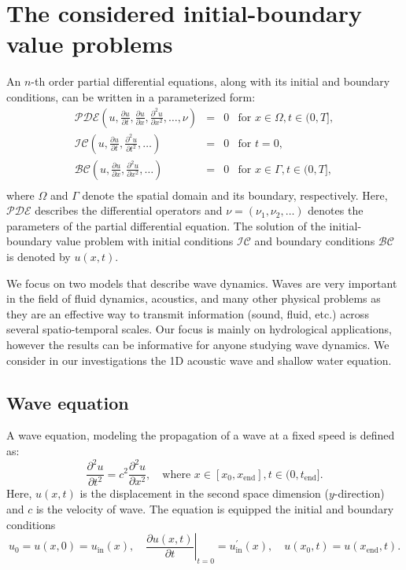 \section{The considered initial-boundary value problems}

An $n$-th order partial differential equations, along with its initial and boundary conditions, can be written in a parameterized form: 
\[
\begin{array}{rcll}
\displaystyle \mathcal{PDE}\left(u, \frac{\partial u}{ \partial t}, \frac{\partial u}{ \partial x}, \frac{{\partial}^2 u}{\partial x^2}, \ldots, \nu\right) &=&0 & \mbox{for } x \in \Omega, t \in (0,T],\\[1em]
\displaystyle \mathcal{IC}\left(u, \frac{\partial u}{ \partial t}, \frac{\partial^2 u}{ \partial t^2}, \ldots\right) &=& 0
& \mbox{for } t = 0, \\[1em]
\displaystyle \mathcal{BC}\left(u, \frac{\partial u}{ \partial x}, \frac{\partial^2 u}{ \partial x^2}, \ldots   \right) &=&0  & \mbox{for } x \in \Gamma, t \in (0,T],\\[1em]
\end{array}
\]
where $\Omega$ and $\Gamma$ denote the spatial domain and its boundary, respectively. 
Here, $\mathcal{PDE}$ describes the differential operators and $\nu = (\nu_1, \nu_2, \ldots)$ 
denotes the parameters of the partial differential equation. The solution of the initial-boundary value 
problem with initial conditions $\mathcal{IC}$ and boundary conditions $\mathcal{BC}$ 
is denoted by $u(x, t)$.

We focus on two models that describe wave dynamics. Waves are very important in the field of fluid dynamics,
acoustics, and many other physical problems as they are an effective way to transmit information (sound, fluid, etc.) across several spatio-temporal scales. 
Our focus is mainly on hydrological applications, however the results can be informative for anyone studying wave dynamics.
We consider in our investigations the  1D acoustic wave and shallow water equation. 
 
\subsection{Wave equation}

A wave equation, modeling the propagation of a wave at a fixed speed is defined as:
\begin{equation}
\label{eq:wave}
\frac{\partial^2u}{\partial t^2} = c^2 \frac{\partial^2u}{\partial x^2},\quad \mbox{where } x \in [x_0, x_{\mathrm{end}}], t \in (0, t_{\mathrm{end}}].
\end{equation}
Here, $u(x, t)$ is the displacement in the second space dimension ($y$-direction) and $c$ is the velocity of wave. The equation is equipped the initial and boundary conditions
\begin{equation}\label{eq:wave_cond}
u_0 = u(x,0) = u_{\mathrm{in}}(x), \quad
\left.\frac{\partial u(x, t)}{\partial t} \right|_{t=0} = u^{\prime}_{\mathrm{in}}(x), \quad 
u(x_0, t) = u(x_{\mathrm{end}}, t). 
\end{equation}

